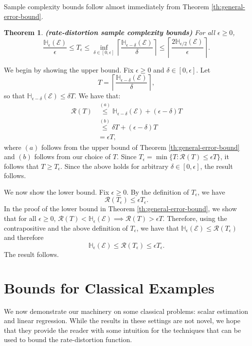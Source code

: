 \documentclass[twoside,11pt]{article}
\renewenvironment{proof}{\par\noindent{\bf Proof\ }}{\hfill\BlackBox\\[2mm]}
\newenvironment{proof}{\par\noindent{\bf Proof\ }}{\hfill\BlackBox\\[2mm]}
\newtheorem{theorem}{Theorem}
\def\environment{\mathcal{E}}
\def\regret{\mathcal{R}}
\def\H{\mathbb{H}}
\begin{document}
Sample complexity bounds follow almost immediately from Theorem \ref{th:general-error-bound}.
\begin{theorem}{\bf (rate-distortion sample complexity bounds)}
\label{th:general-sample-bound}
For all $\epsilon \geq 0$,
$$\frac{\H_{\epsilon}(\environment)}{\epsilon} \leq T_\epsilon \leq \inf_{\delta \in [0,\epsilon]} \left\lceil\frac{\H_{\epsilon-\delta}(\environment)}{\delta} \right\rceil \leq \left\lceil\frac{2 \H_{\epsilon/2}(\environment)}{\epsilon} \right\rceil.$$
\end{theorem}
\begin{proof}
We begin by showing the upper bound. Fix $\epsilon \geq 0$ and $\delta \in [0,\epsilon]$.  Let
$$T = \left\lceil\frac{\H_{\epsilon-\delta}(\environment)}{\delta} \right\rceil,$$
so that $\H_{\epsilon-\delta}(\environment) \leq \delta T$.  We have that:
\begin{align*}
    \regret(T)
    & \overset{(a)}{\leq} \H_{\epsilon-\delta}(\environment) + (\epsilon-\delta) T\\
    & \overset{(b)}{\leq} \delta T + (\epsilon-\delta) T\\
    & = \epsilon T,
\end{align*}
where $(a)$ follows from the upper bound of Theorem \ref{th:general-error-bound} and $(b)$ follows from our choice of $T$. Since $T_\epsilon = \min\{T : \regret(T) \leq \epsilon T\}$, it follows that $T \geq T_\epsilon$.  Since the above holds for arbitrary $\delta \in [0, \epsilon]$, the result follows.
    
We now show the lower bound. Fix $\epsilon \geq 0$.  By the definition of $T_\epsilon$, we have
$$\regret(T_\epsilon) \leq \epsilon T_\epsilon.$$
In the proof of the lower bound in Theorem \ref{th:general-error-bound}, we show that for all $\epsilon \geq 0$, $\regret(T) < \H_{\epsilon}(\environment) \implies \regret(T) > \epsilon T$. Therefore, using the contrapositive and the above definition of $T_\epsilon$, we have that $\H_{\epsilon}(\environment) \leq \regret(T_\epsilon)$ and therefore
$$\H_{\epsilon}(\environment) \leq \regret(T_\epsilon) \leq \epsilon T_\epsilon.$$
The result follows.
\end{proof}

\section{Bounds for Classical Examples}

We now demonstrate our machinery on some classical problems: scalar estimation and linear regression. While the results in these settings are not novel, we hope that they provide the reader with some intuition for the techniques that can be used to bound the rate-distortion function.
\end{document}
